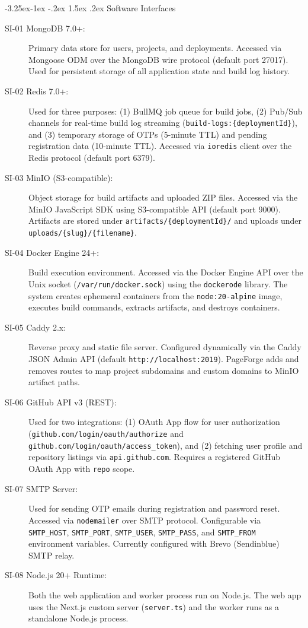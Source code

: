 \documentclass[12pt,a4paper]{article}
\makeatletter
\renewcommand\subsection{\@startsection{subsection}{2}{\z@}%
  {-3.25ex\@plus -1ex \@minus -.2ex}%
  {1.5ex \@plus .2ex}%
  {\needspace{2\baselineskip}\normalfont\large\bfseries}}
\makeatother
\begin{document}
\subsection{Software Interfaces}
\begin{description}
    \item[SI-01 MongoDB 7.0+:] Primary data store for users, projects, and deployments. Accessed via Mongoose ODM over the MongoDB wire protocol (default port 27017). Used for persistent storage of all application state and build log history.
    \item[SI-02 Redis 7.0+:] Used for three purposes: (1) BullMQ job queue for build jobs, (2) Pub/Sub channels for real-time build log streaming (\texttt{build-logs:\{deploymentId\}}), and (3) temporary storage of OTPs (5-minute TTL) and pending registration data (10-minute TTL). Accessed via \texttt{ioredis} client over the Redis protocol (default port 6379).
    \item[SI-03 MinIO (S3-compatible):] Object storage for build artifacts and uploaded ZIP files. Accessed via the MinIO JavaScript SDK using S3-compatible API (default port 9000). Artifacts are stored under \texttt{artifacts/\{deploymentId\}/} and uploads under \texttt{uploads/\{slug\}/\{filename\}}.
    \item[SI-04 Docker Engine 24+:] Build execution environment. Accessed via the Docker Engine API over the Unix socket (\texttt{/var/run/docker.sock}) using the \texttt{dockerode} library. The system creates ephemeral containers from the \texttt{node:20-alpine} image, executes build commands, extracts artifacts, and destroys containers.
    \item[SI-05 Caddy 2.x:] Reverse proxy and static file server. Configured dynamically via the Caddy JSON Admin API (default \texttt{http://localhost:2019}). PageForge adds and removes routes to map project subdomains and custom domains to MinIO artifact paths.
    \item[SI-06 GitHub API v3 (REST):] Used for two integrations: (1) OAuth App flow for user authorization (\texttt{github.com/login/oauth/authorize} and \texttt{github.com/login/oauth/access\_token}), and (2) fetching user profile and repository listings via \texttt{api.github.com}. Requires a registered GitHub OAuth App with \texttt{repo} scope.
    \item[SI-07 SMTP Server:] Used for sending OTP emails during registration and password reset. Accessed via \texttt{nodemailer} over SMTP protocol. Configurable via \texttt{SMTP\_HOST}, \texttt{SMTP\_PORT}, \texttt{SMTP\_USER}, \texttt{SMTP\_PASS}, and \texttt{SMTP\_FROM} environment variables. Currently configured with Brevo (Sendinblue) SMTP relay.
    \item[SI-08 Node.js 20+ Runtime:] Both the web application and worker process run on Node.js. The web app uses the Next.js custom server (\texttt{server.ts}) and the worker runs as a standalone Node.js process.
\end{description}
\end{document}
